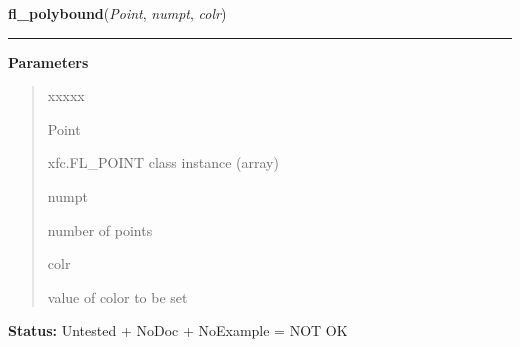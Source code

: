 \hspace{.8\funcindent}\begin{boxedminipage}{\funcwidth}

    \raggedright \textbf{fl\_polybound}(\textit{Point}, \textit{numpt}, \textit{colr})

    \vspace{-1.5ex}

    \rule{\textwidth}{0.5\fboxrule}
\setlength{\parskip}{2ex}
\setlength{\parskip}{1ex}
      \textbf{Parameters}
      \vspace{-1ex}

      \begin{quote}
        \begin{Ventry}{xxxxx}

          \item[Point]

          xfc.FL\_POINT class instance (array)

          \item[numpt]

          number of points

          \item[colr]

          value of color to be set

        \end{Ventry}

      \end{quote}

\textbf{Status:} Untested + NoDoc + NoExample = NOT OK



    \end{boxedminipage}

    \label{xformslib:library:fl_lines}

    \vspace{0.5ex}

